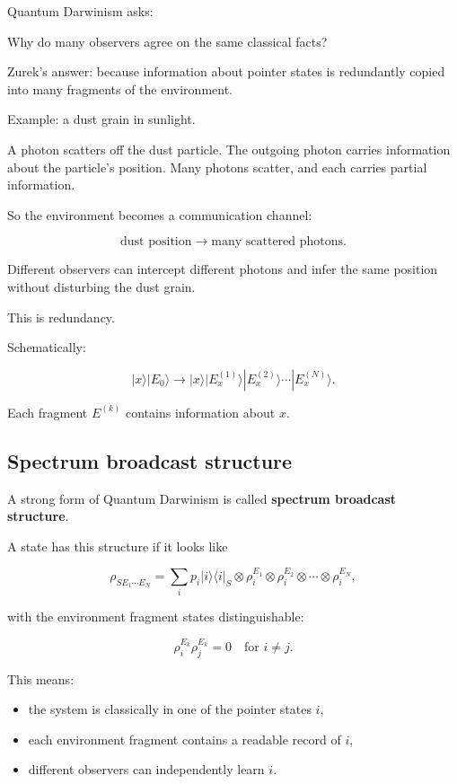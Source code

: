 \documentclass[11pt,a4paper]{article}
\newenvironment{qiqtquote}{\begin{mdframed}[style=quotestyle]}{\end{mdframed}}
\begin{document}
Quantum Darwinism asks:

\begin{qiqtquote}
Why do many observers agree on the same classical facts?
\end{qiqtquote}

Zurek’s answer: because information about pointer states is redundantly copied into many fragments of the environment.

Example: a dust grain in sunlight.

A photon scatters off the dust particle. The outgoing photon carries information about the particle’s position. Many photons scatter, and each carries partial information.

So the environment becomes a communication channel:

\[
\text{dust position}
\longrightarrow
\text{many scattered photons}.
\]

Different observers can intercept different photons and infer the same position without disturbing the dust grain.

This is redundancy.

Schematically:

\[
|x\rangle |E_0\rangle
\longrightarrow
|x\rangle |E_x^{(1)}\rangle |E_x^{(2)}\rangle \cdots |E_x^{(N)}\rangle.
\]

Each fragment $E^{(k)}$ contains information about $x$.

\subsection{Spectrum broadcast structure}

A strong form of Quantum Darwinism is called \textbf{spectrum broadcast structure}.

A state has this structure if it looks like

\[
\rho_{S E_1 \cdots E_N}
=
\sum_i p_i |i\rangle\langle i|_S
\otimes \rho_i^{E_1}
\otimes \rho_i^{E_2}
\otimes \cdots
\otimes \rho_i^{E_N},
\]

with the environment fragment states distinguishable:

\[
\rho_i^{E_k}\rho_j^{E_k}=0
\quad
\text{for } i\neq j.
\]

This means:

\begin{itemize}
  \item the system is classically in one of the pointer states $i$,
  \item each environment fragment contains a readable record of $i$,
  \item different observers can independently learn $i$.
\end{itemize}
\end{document}
